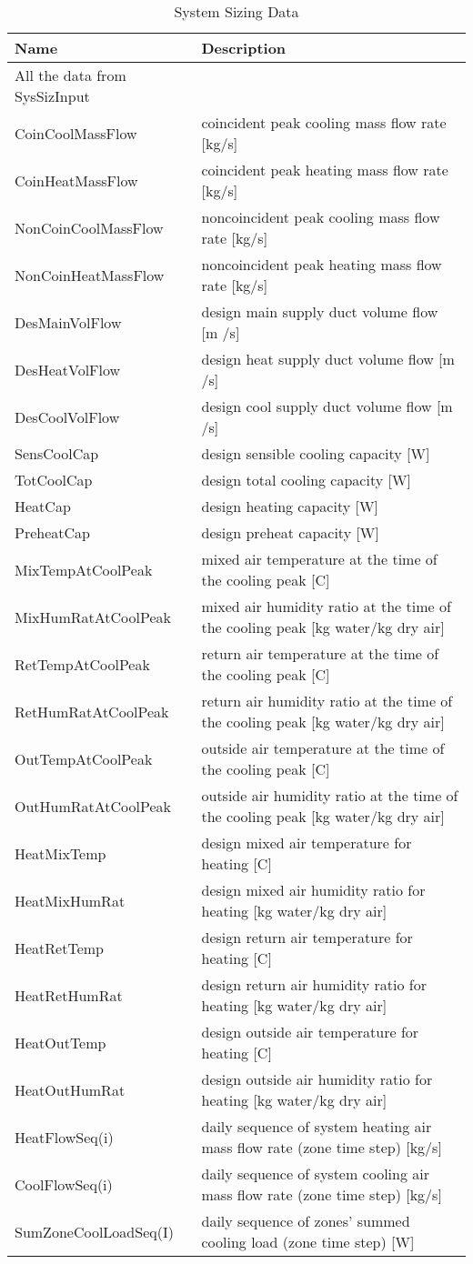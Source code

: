 \begin{longtable}[c]{p{1.5in}p{4.5in}}
\caption{System Sizing Data \protect \label{table:system-sizing-data}}\\
\toprule 
Name & Description \tabularnewline \midrule
\endhead
All the data from SysSizInput &  \tabularnewline
CoinCoolMassFlow & coincident peak cooling mass flow rate [kg/s] \tabularnewline
CoinHeatMassFlow & coincident peak heating mass flow rate [kg/s] \tabularnewline
NonCoinCoolMassFlow & noncoincident peak cooling mass flow rate [kg/s] \tabularnewline
NonCoinHeatMassFlow & noncoincident peak heating mass flow rate [kg/s] \tabularnewline
DesMainVolFlow & design main supply duct volume flow [m  /s] \tabularnewline
DesHeatVolFlow & design heat supply duct volume flow [m  /s] \tabularnewline
DesCoolVolFlow & design cool supply duct volume flow [m  /s] \tabularnewline
SensCoolCap & design sensible cooling capacity [W] \tabularnewline
TotCoolCap & design total cooling capacity [W] \tabularnewline
HeatCap & design heating capacity [W] \tabularnewline
PreheatCap & design preheat capacity [W] \tabularnewline
MixTempAtCoolPeak & mixed air temperature at the time of the cooling peak [C] \tabularnewline
MixHumRatAtCoolPeak & mixed air humidity ratio at the time of the cooling peak [kg water/kg dry air] \tabularnewline
RetTempAtCoolPeak & return air temperature at the time of the cooling peak [C] \tabularnewline
RetHumRatAtCoolPeak & return air humidity ratio at the time of the cooling peak [kg water/kg dry air] \tabularnewline
OutTempAtCoolPeak & outside air temperature at the time of the cooling peak [C] \tabularnewline
OutHumRatAtCoolPeak & outside air humidity ratio at the time of the cooling peak [kg water/kg dry air] \tabularnewline
HeatMixTemp & design mixed air temperature for heating [C] \tabularnewline
HeatMixHumRat & design mixed air humidity ratio for heating [kg water/kg dry air] \tabularnewline
HeatRetTemp & design return air temperature for heating [C] \tabularnewline
HeatRetHumRat & design return air humidity ratio for heating [kg water/kg dry air] \tabularnewline
HeatOutTemp & design outside air temperature for heating [C] \tabularnewline
HeatOutHumRat & design outside air humidity ratio for heating [kg water/kg dry air] \tabularnewline
HeatFlowSeq(i) & daily sequence of system heating air mass flow rate (zone time step) [kg/s] \tabularnewline
CoolFlowSeq(i) & daily sequence of system cooling air mass flow rate (zone time step) [kg/s] \tabularnewline
SumZoneCoolLoadSeq(I) & daily sequence of zones' summed cooling load (zone time step) [W] \tabularnewline

\end{longtable}
